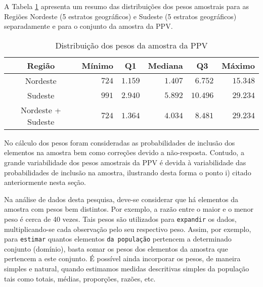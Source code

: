 \documentclass[]{book}
\numberwithin{example}{chapter}
\numberwithin{remark}{chapter}
\numberwithin{definition}{chapter}
\begin{document}
A Tabela \ref{table:Tab12} apresenta um resumo das distribuições dos
pesos amostrais para as Regiões Nordeste (5 estratos geográficos) e
Sudeste (5 estratos geográficos) separadamente e para o conjunto da
amostra da PPV.

\begin{center}
\begin{table}[htbp] \centering

\caption{Distribuição dos pesos da amostra da PPV}\bigskip \label{table:Tab12} 
\begin{tabular}{|c|r|c|r|c|r|}
\hline\hline
Região & Mínimo & Q1 & Mediana & Q3 & Máximo \\ \hline\hline
Nordeste & $724$ & \multicolumn{1}{|r|}{$1.159$} & $1.407$ & 
\multicolumn{1}{|r|}{$6.752$} & $15.348$ \\ 
Sudeste & $991$ & \multicolumn{1}{|r|}{$2.940$} & $5.892$ & 
\multicolumn{1}{|r|}{$10.496$} & $29.234$ \\ 
Nordeste + Sudeste & $724$ & \multicolumn{1}{|r|}{$1.364$} & $4.034$ & 
\multicolumn{1}{|r|}{$8.481$} & $29.234$ \\ \hline\hline
\end{tabular}

\end{table}

\end{center}

No cálculo dos pesos foram consideradas as probabilidades de inclusão
dos elementos na amostra bem como correções devido a não-resposta.
Contudo, a grande variabilidade dos pesos amostrais da PPV é devida à
variabilidade das probabilidades de inclusão na amostra, ilustrando
desta forma o ponto i) citado anteriormente nesta seção.

Na análise de dados desta pesquisa, deve-se considerar que há elementos
da amostra com pesos bem distintos. Por exemplo, a razão entre o maior e
o menor peso é cerca de 40 vezes. Tais pesos são utilizados para
\texttt{expandir} os dados, multiplicando-se cada observação pelo seu
respectivo peso. Assim, por exemplo, para \texttt{estimar} quantos
elementos \texttt{da\ população} pertencem a determinado conjunto
(domínio), basta somar os pesos dos elementos da amostra que pertencem a
este conjunto. É possível ainda incorporar os pesos, de maneira simples
e natural, quando estimamos medidas descritivas simples da população
tais como totais, médias, proporções, razões, etc.
\end{document}
